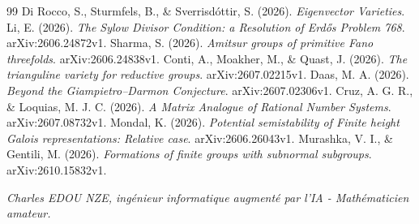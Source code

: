 \documentclass[
]{article}
\begin{document}
\begin{thebibliography}{99}
 Di Rocco, S., Sturmfels, B., \& Sverrisdóttir, S. (2026). \textit{Eigenvector Varieties}.
 Li, E. (2026). \textit{The Sylow Divisor Condition: a Resolution of Erdős Problem 768}. arXiv:2606.24872v1.
 Sharma, S. (2026). \textit{Amitsur groups of primitive Fano threefolds}. arXiv:2606.24838v1.
 Conti, A., Moakher, M., \& Quast, J. (2026). \textit{The trianguline variety for reductive groups}. arXiv:2607.02215v1.
 Daas, M. A. (2026). \textit{Beyond the Giampietro--Darmon Conjecture}. arXiv:2607.02306v1.
 Cruz, A. G. R., \& Loquias, M. J. C. (2026). \textit{A Matrix Analogue of Rational Number Systems}. arXiv:2607.08732v1.
 Mondal, K. (2026). \textit{Potential semistability of Finite height Galois representations: Relative case}. arXiv:2606.26043v1.
 Murashka, V. I., \& Gentili, M. (2026). \textit{Formations of finite groups with subnormal subgroups}. arXiv:2610.15832v1.
\end{thebibliography}





\vspace{1cm}
\begin{flushright}
\textit{Charles EDOU NZE, ingénieur informatique augmenté par l'IA - Mathématicien amateur.}
\end{flushright}
\end{document}
